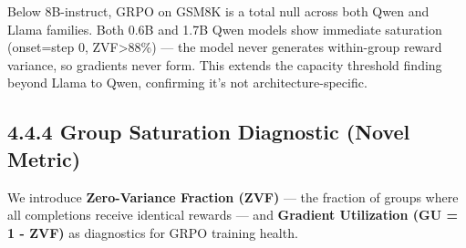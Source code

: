 \documentclass[
  american,
  11pt,
  a4paper,
  oneside]{report}
\begin{document}
Below 8B-instruct, GRPO on GSM8K is a total null across both Qwen and
Llama families. Both 0.6B and 1.7B Qwen models show immediate saturation
(onset=step 0, ZVF\textgreater88\%) --- the model never generates
within-group reward variance, so gradients never form. This extends the
capacity threshold finding beyond Llama to Qwen, confirming it's not
architecture-specific.

\subsection{4.4.4 Group Saturation Diagnostic (Novel
Metric)}\label{group-saturation-diagnostic-novel-metric}

We introduce \textbf{Zero-Variance Fraction (ZVF)} --- the fraction of
groups where all completions receive identical rewards --- and
\textbf{Gradient Utilization (GU = 1 - ZVF)} as diagnostics for GRPO
training health.
\end{document}
